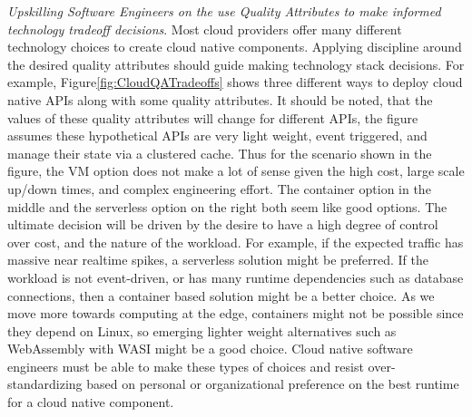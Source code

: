 \documentclass[conference]{IEEEconf}
\begin{document}
\textit{Upskilling Software Engineers on the use Quality Attributes to make informed technology tradeoff decisions}. Most cloud providers offer many different technology choices to create cloud native components.  Applying discipline around the desired quality attributes should guide making technology stack decisions. For example, Figure\ref{fig:CloudQATradeoffs} shows three different ways to deploy cloud native APIs along with some quality attributes.  It should be noted, that the values of these quality attributes will change for different APIs, the figure assumes these hypothetical APIs are very light weight, event triggered, and manage their state via a clustered cache.  Thus for the scenario shown in the figure, the VM option does not make a lot of sense given the high cost, large scale up/down times, and complex engineering effort.  The container option in the middle and the serverless option on the right both seem like good options.  The ultimate decision will be driven by the desire to have a high degree of control over cost, and the nature of the workload. For example, if the expected traffic has massive near realtime spikes, a serverless solution might be preferred. If the workload is not event-driven, or has many runtime dependencies such as database connections, then a container based solution might be a better choice. As we move more towards computing at the edge, containers might not be possible since they depend on Linux, so emerging lighter weight alternatives such as WebAssembly with WASI\cite{WASI} might be a good choice.  Cloud native software engineers must be able to make these types of choices and resist over-standardizing based on personal or organizational preference on the best runtime for a cloud native component. 
\end{document}
